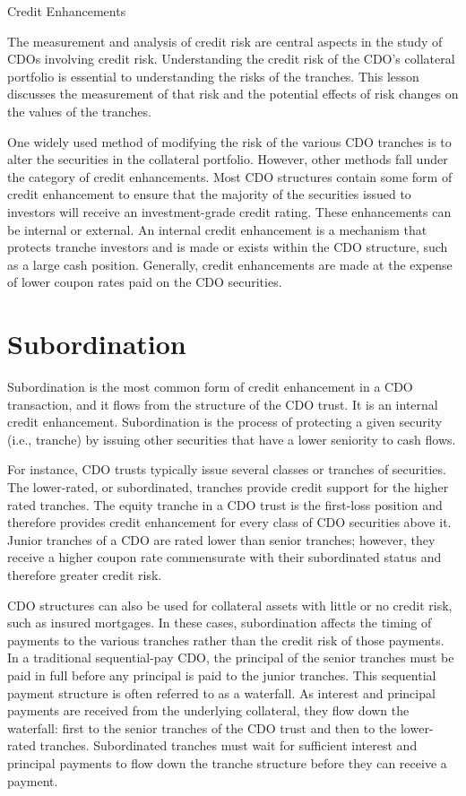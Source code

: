 \documentclass[11pt]{article}
\begin{document}
Credit Enhancements

The measurement and analysis of credit risk are central aspects in the study of CDOs involving credit risk. Understanding the credit risk of the CDO's collateral portfolio is essential to understanding the risks of the tranches. This lesson discusses the measurement of that risk and the potential effects of risk changes on the values of the tranches.

One widely used method of modifying the risk of the various CDO tranches is to alter the securities in the collateral portfolio. However, other methods fall under the category of credit enhancements. Most CDO structures contain some form of credit enhancement to ensure that the majority of the securities issued to investors will receive an investment-grade credit rating. These enhancements can be internal or external. An internal credit enhancement is a mechanism that protects tranche investors and is made or exists within the CDO structure, such as a large cash position. Generally, credit enhancements are made at the expense of lower coupon rates paid on the CDO securities.

\section*{Subordination}
Subordination is the most common form of credit enhancement in a CDO transaction, and it flows from the structure of the CDO trust. It is an internal credit enhancement. Subordination is the process of protecting a given security (i.e., tranche) by issuing other securities that have a lower seniority to cash flows.

For instance, CDO trusts typically issue several classes or tranches of securities. The lower-rated, or subordinated, tranches provide credit support for the higher rated tranches. The equity tranche in a CDO trust is the first-loss position and therefore provides credit enhancement for every class of CDO securities above it. Junior tranches of a CDO are rated lower than senior tranches; however, they receive a higher coupon rate commensurate with their subordinated status and therefore greater credit risk.

CDO structures can also be used for collateral assets with little or no credit risk, such as insured mortgages. In these cases, subordination affects the timing of payments to the various tranches rather than the credit risk of those payments. In a traditional sequential-pay CDO, the principal of the senior tranches must be paid in full before any principal is paid to the junior tranches. This sequential payment structure is often referred to as a waterfall. As interest and principal payments are received from the underlying collateral, they flow down the waterfall: first to the senior tranches of the CDO trust and then to the lower-rated tranches. Subordinated tranches must wait for sufficient interest and principal payments to flow down the tranche structure before they can receive a payment.
\end{document}
